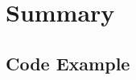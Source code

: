 \documentclass{article}
\begin{document}
\subsection{}
\subsection{}
\subsection{}

\section{Summary}




\newpage

\begin{appendices}
\section{Code Example}


\end{appendices}
\end{document}

